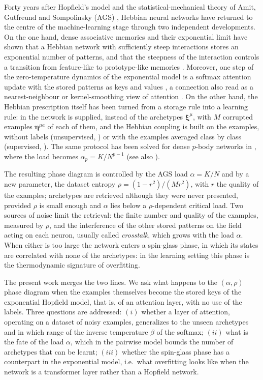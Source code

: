 \documentclass[11pt,a4paper]{article}
\newcommand{\x}{\bm{\xi}}
\newcommand{\e}{\bm{\eta}}
\begin{document}
Forty years after Hopfield's model \cite{Hopfield1982} and the statistical-mechanical theory of Amit, Gutfreund and Sompolinsky (AGS) \cite{AGS1985,AGS1987}, Hebbian neural networks have returned to the centre of the machine-learning stage through two independent developments. On the one hand, dense associative memories \cite{Krotov2016,Krotov2018,Demircigil2017} and their exponential limit \cite{Ramsauer2021,Lucibello2024,Albanese2025exp} have shown that a Hebbian network with sufficiently steep interactions stores an exponential number of patterns, and that the steepness of the interaction controls a transition from feature-like to prototype-like memories \cite{Krotov2016}. Moreover, one step of the zero-temperature dynamics of the exponential model is a softmax attention update with the stored patterns as keys and values \cite{Ramsauer2021,Hoover2024}, a connection also read as a nearest-neighbour or kernel-smoothing view of attention \cite{Tsai2019,Bricken2021,Millidge2022}. On the other hand, the Hebbian prescription itself has been turned from a storage rule into a learning rule: in \cite{Agliari2022concept,Alemanno2023} the network is supplied, instead of the archetypes $\x^\mu$, with $M$ corrupted examples $\e^{\mu a}$ of each of them, and the Hebbian coupling is built on the examples, without labels (unsupervised, \cite{Agliari2022concept}) or with the examples averaged class by class (supervised, \cite{Alemanno2023}). The same protocol has been solved for dense $p$-body networks in \cite{Agliari2023sup,Agliari2023unsup}, where the load becomes $\alpha_p=K/N^{p-1}$ (see also \cite{Albanese2024first,Agliari2024dreaming,Fontanari1990}).

The resulting phase diagram is controlled by the AGS load $\alpha=K/N$ and by a new parameter, the dataset entropy $\rho=(1-r^2)/(Mr^2)$, with $r$ the quality of the examples; archetypes are retrieved although they were never presented, provided $\rho$ is small enough and $\alpha$ lies below a $\rho$-dependent critical load. Two sources of noise limit the retrieval: the finite number and quality of the examples, measured by $\rho$, and the interference of the other stored patterns on the field acting on each neuron, usually called \emph{crosstalk}, which grows with the load $\alpha$. When either is too large the network enters a spin-glass phase, in which its states are correlated with none of the archetypes: in the learning setting this phase is the thermodynamic signature of overfitting.

The present work merges the two lines. We ask what happens to the $(\alpha,\rho)$ phase diagram when the examples themselves become the stored keys of the exponential Hopfield model, that is, of an attention layer, with no use of the labels. Three questions are addressed: $(i)$ whether a layer of attention, operating on a dataset of noisy examples, generalizes to the unseen archetypes and in which range of the inverse temperature $\beta$ of the softmax; $(ii)$ what is the fate of the load $\alpha$, which in the pairwise model bounds the number of archetypes that can be learnt; $(iii)$ whether the spin-glass phase has a counterpart in the exponential model, i.e.\ what overfitting looks like when the network is a transformer layer rather than a Hopfield network.
\end{document}
